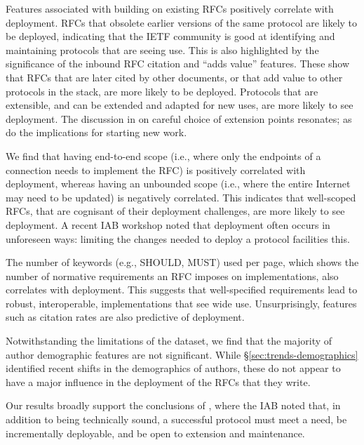 \documentclass[twocolumn,10pt]{article}
\newcommand{\pb}[1]{\vspace{0.75ex}\noindent{\textbf{#1}}}
\begin{document}
\pb{Discussion:}
Features associated with building on existing RFCs positively correlate
with deployment. RFCs that obsolete earlier versions of the same protocol
are likely to be deployed, indicating that the IETF community is good at
identifying and maintaining protocols that are seeing use. This is also
highlighted by the significance of the inbound RFC citation and ``adds
value'' features. These show that RFCs that are later cited by other
documents, or that add value to other protocols in the stack, are more
likely to be deployed. Protocols that are extensible, and can be extended
and adapted for new uses, are more likely to see deployment. The discussion
in \cite{clark:2002:tussle} on careful choice of extension points
resonates; as do the implications for starting new work.

We find that having end-to-end scope (i.e., where only the endpoints of a
connection needs to implement the RFC) is positively correlated with
deployment, whereas having an unbounded scope (i.e., where the entire
Internet may need to be updated) is negatively correlated. This indicates
that well-scoped RFCs, that are cognisant of their deployment challenges,
are more likely to see deployment. A recent IAB workshop \cite{rfc8980}
noted that deployment often occurs in unforeseen ways: limiting the changes
needed to deploy a protocol facilities this.

The number of keywords (e.g., SHOULD, MUST) used per page, which shows the
number of normative requirements an RFC imposes on implementations, also
correlates with deployment. This suggests that well-specified requirements
lead to robust, interoperable, implementations that see wide use.
Unsurprisingly, features such as citation rates are also predictive of
deployment.

Notwithstanding the limitations of the dataset, we find that the majority
of author demographic features are not significant. While \S\ref{sec:trends-demographics}
identified recent shifts in the demographics of authors, these do not
appear to have a major influence in the deployment of the RFCs that they
write.

Our results broadly support the conclusions of \cite{RFC5218}, where the
IAB noted that, in addition to being technically sound, a successful
protocol must meet a need, be incrementally deployable, and be open to
extension and maintenance.
\end{document}
